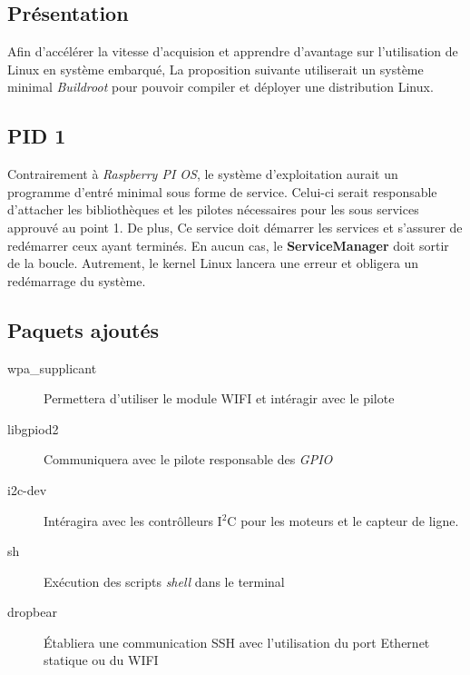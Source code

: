 \subsection{Présentation}
Afin d'accélérer la vitesse d'acquision et apprendre d'avantage sur l'utilisation de Linux en système embarqué,
La proposition suivante utiliserait un système minimal \textit{Buildroot} pour pouvoir compiler et déployer une distribution Linux.

\subsection{PID 1}
Contrairement à \textit{Raspberry PI OS}, le système d'exploitation aurait un programme d'entré minimal sous forme de service.
Celui-ci serait responsable d'attacher les bibliothèques et les pilotes nécessaires pour les sous services approuvé au point 1.
De plus, Ce service doit démarrer les services et s'assurer de redémarrer ceux ayant terminés.
En aucun cas, le \textbf{ServiceManager} doit sortir de la boucle. Autrement, le kernel Linux lancera une erreur et obligera un redémarrage du système.

\subsection{Paquets ajoutés}
\begin{description}
    \item[wpa\_supplicant] Permettera d'utiliser le module WIFI et intéragir avec le pilote
    \item[libgpiod2] Communiquera avec le pilote responsable des \textit{GPIO}
    \item[i2c-dev] Intéragira avec les contrôlleurs I$^2$C pour les moteurs et le capteur de ligne.
    \item[sh] Exécution des scripts \textit{shell} dans le terminal  
    \item[dropbear] Établiera une communication SSH avec l'utilisation du port Ethernet statique ou du WIFI 
\end{description}